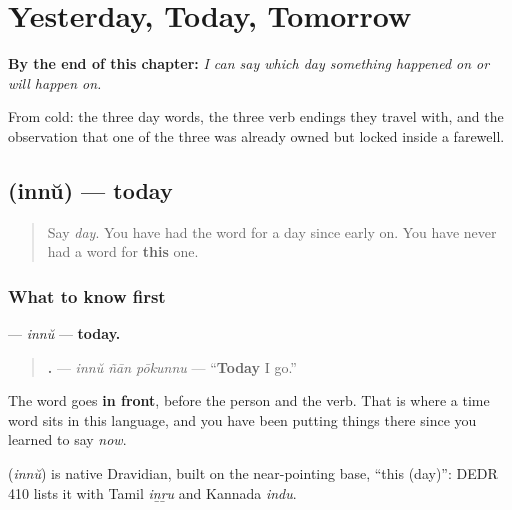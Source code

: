 
\chapter{Yesterday, Today, Tomorrow}
\label{ch:ml-days}

\begin{chapteropening}
\textbf{By the end of this chapter:} \emph{I can say which day something happened on or will happen on.}

From cold: the three day words, the three verb endings they travel with, and the observation that one of the three was already owned but locked inside a farewell.
\end{chapteropening}

\section[\texorpdfstring{\ml{ഇന്ന്} (innŭ)}{ഇന്ന് (innŭ)}]{ (innŭ) — today}

\label{lesson:ML-C94-innu}



\begin{quote}
Say \emph{day}. You have had the word for a day since early on. You have never had a word for \textbf{this} one.
\end{quote}

\subsection*{What to know first}
\textbf{} — \emph{innŭ} — \textbf{today.}

\begin{quote}
\textbf{  .} — \emph{innŭ ñān pōkunnu} — \textquotedblleft{}\textbf{Today} I go.\textquotedblright{}
\end{quote}

The word goes \textbf{in front}, before the person and the verb. That is where a time word sits in this language, and you have been putting things there since you learned to say \emph{now}.

\begin{cousinweb}
\textbf{} (\emph{innŭ}) is native Dravidian, built on the near-pointing base, \textquotedblleft{}this (day)\textquotedblright{}: DEDR 410 lists it with Tamil \emph{iṉṟu} and Kannada \emph{indu}.
\end{cousinweb}

